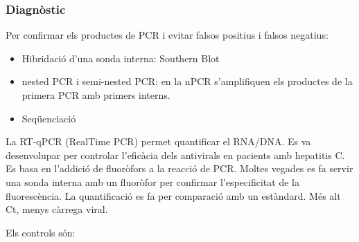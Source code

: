 
\subsubsection{Diagnòstic}
Per confirmar els productes de PCR i evitar falsos positius i falsos negatius:
\begin{itemize}
\item Hibridació d'una sonda interna: Southern Blot
\item nested PCR i semi-nested PCR: en la nPCR s'amplifiquen els productes de la primera PCR amb primers interns.
\item Seqüenciació
\end{itemize}

La RT-qPCR (RealTime PCR) permet quantificar el RNA/DNA. Es va desenvolupar per controlar l'eficàcia dels antivirals en pacients amb hepatitis C. Es basa en l'addició de fluoròfors a la reacció de PCR. Moltes vegades es fa servir una sonda interna amb un fluoròfor per confirmar l'especificitat de la fluorescència. La quantificació es fa per comparació amb un estàndard. Més alt Ct, menys càrrega viral.

Els controls són:

